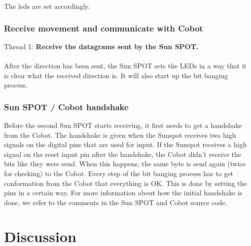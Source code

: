 \documentclass[a4paper,10pt]{article} %
\begin{document}


\noindent The leds are set accordingly.

\subsubsection{Receive movement and communicate with Cobot} %

\noindent Thread 1: \textbf{Receive the datagrams sent by the Sun SPOT.}
\\
\\
After the direction has been sent, the Sun SPOT sets the LEDs in a way that
it is clear what the received direction is. It will also start up the bit
banging process.


\subsubsection{Sun SPOT / Cobot handshake} %
\label{ssub:Sun SPOT / Cobot handshake}

Before the second Sun SPOT starts receiving, it first needs to get a handshake
from the Cobot. The handshake is given when the Sunspot receives two high
signals on the digital pins that are used for input. If the Sunspot receives a
high signal on the reset input pin after the handshake, the Cobot didn't receive
the bits like they were send. When this happens, the same byte is send again
(twice for checking) to the Cobot. Every step of the bit banging process has to
get conformation from the Cobot that everything is OK. This is done by setting
the pins in a certain way. For more information about how the initial handshake
is done, we refer to the comments in the Sun SPOT and Cobot source code.





\section{Discussion} %
\end{document}
